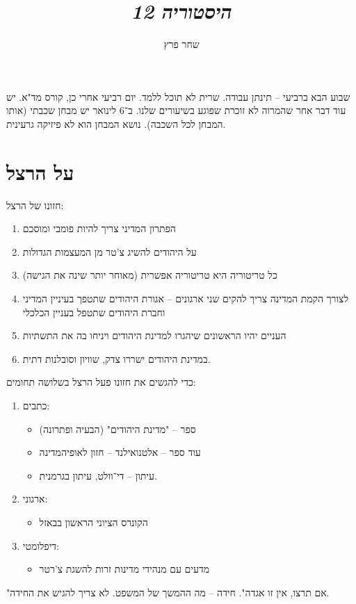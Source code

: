 \documentclass[]{article}
\author{שחר פרץ}
\title{\textit{היסטוריה 12}}
\begin{document}
	\maketitle
	
	שבוע הבא ברביעי – תינתן עבודה. שרית לא תוכל ללמד. יום רביעי אחרי כן, קורס מד"א. יש עוד דבר אחר שהמרוה לא זוכרת שפוגע בשיעורים שלנו. ב־6 לינואר יש מבחן שכבתי (אותו המבחן לכל השכבה). נושא המבחן הוא לא פיזיקה גרעינית. 
	\section{על הרצל}
	חזונו של הרצל: 
	\begin{enumerate}
		\item הפתרון המדיני צריך להיות פומבי ומוסכם
		\item על היהודים להשיג צ'טר מן המעצמות הגדולות
		\item כל טריטוריה היא טריטוריה אפשרית (מאוחר יותר שינה את הגישה)
		\item לצורך הקמת המדינה צריך להקים שני ארגונים – אגורת היהודים שתטפך בעיניין המדיני וחברת היהודים שתטפל בעניין הכלכלי
		\item העניים יהיו הראשונים שיהגרו למדינת היהודים ויניחו בה את התשתיות
		\item במדינת היהודים ישררו צדק, שוויון וסובלנות דתית. 
	\end{enumerate}
	כדי להגשים את חזונו פעל הרצל בשלושה תחומים: 
	\begin{enumerate}
		\item כתבים: 
		\begin{itemize}
			\item ספר – "מדינת היהודים" (הבעיה ופתרונה)
			\item עוד ספר – אלטנואילנד – חזון לאופיהמדינה
			\item עיתון – די־וולט, עיתון בגרמנית. 
		\end{itemize}
		\item ארגוני: 
		\begin{itemize}
			\item הקונרס הציוני הראשון בבאזל
		\end{itemize}
		\item דיפלומטי: 
		\begin{itemize}
			\item מדעים עם מנהידי מדינות זרות להשגת צ'רטר
		\end{itemize}
	\end{enumerate}
	
	"אם תרצו, אין זו אגדה". חידה – מה ההמשך של המשפט. לא צריך להגיש את החידה. 
	
\end{document}
